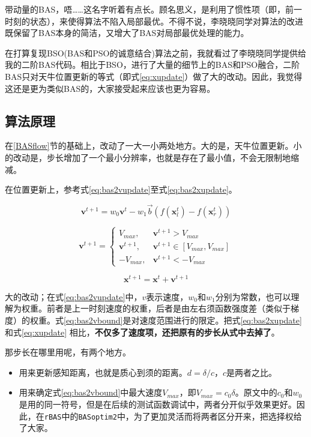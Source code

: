 \documentclass[]{ctexbook}
\providecommand{\tightlist}{%
  \setlength{\itemsep}{0pt}\setlength{\parskip}{0pt}}
\begin{document}
带动量的BAS，唔\ldots{}\ldots{}这名字听着有点长。顾名思义，是利用了惯性项（即，前一时刻的状态），来使得算法不陷入局部最优。不得不说，李晓晓同学对算法的改进既保留了BAS本身的简洁，又增大了BAS对局部最优处理的能力。

在打算复现BSO(BAS和PSO的诚意结合)算法之前，我就看过了李晓晓同学提供给我的二阶BAS代码。相比于BSO，进行了大量的细节上的BAS和PSO融合，二阶BAS只对天牛位置更新的等式（即式\eqref{eq:xupdate}）做了大的改动。因此，我觉得这还是更为类似BAS的，大家接受起来应该也更为容易。

\subsection{算法原理}

在\ref{BASflow}节的基础上，改动了一大一小两处地方。大的是，天牛位置更新。小的改动是，步长增加了一个最小分辨率，也就是存在了最小值，不会无限制地缩减。

在位置更新上，参考式\eqref{eq:bas2vupdate}至式\eqref{eq:bas2xupdate}。

\begin{equation}
\mathbf{v}^{t+1} = w_0\mathbf{v}^t - w_1\overrightarrow{b}(f(\mathbf{x}_l^t)-f(\mathbf{x}_r^t))
\label{eq:bas2vupdate}
\end{equation}

\begin{equation}
\mathbf{v}^{t+1} = \begin{cases} 
V_{max},&\mathbf{v}^{t+1} > V_{max} \\ 
\mathbf{v}^{t+1},  &\mathbf{v}^{t+1} \in [V_{max},V_{max}] \\
-V_{max},&\mathbf{v}^{t+1} <- V_{max}
\end{cases}
\label{eq:bas2vbound}
\end{equation}

\begin{equation}
\mathbf{x}^{t+1} = \mathbf{x}^t+\mathbf{v}^{t+1}
\label{eq:bas2xupdate}
\end{equation}

大的改动；在式\eqref{eq:bas2vupdate}中，\(v\)表示速度，\(w_0\)和\(w_1\)分别为常数，也可以理解为权重。前者是上一时刻速度的权重，后者是由左右须函数强度差（类似于梯度）的权重。式\eqref{eq:bas2vbound}是对速度范围进行的限定。把式\eqref{eq:bas2xupdate}
和式\eqref{eq:xupdate}
相比，\textbf{不仅多了速度项，还把原有的步长从式中去掉了}。

那步长在哪里用呢，有两个地方。

\begin{itemize}
\tightlist
\item
  用来更新感知距离，也就是质心到须的距离。\(d = \delta/c\)，\(c\)是两者之比。
\item
  用来确定式\eqref{eq:bas2vbound}中最大速度\(V_{max}\)，即\(V_{max} = c_0 \delta\)。原文中的\(c_0\)和\(w_0\)是用的同一符号，但是在后续的测试函数调试中，两者分开似乎效果更好。因此，在\texttt{rBAS}中的\texttt{BASoptim2}中，为了更加灵活而将两者区分开来，把选择权给了大家。
\end{itemize}
\end{document}
